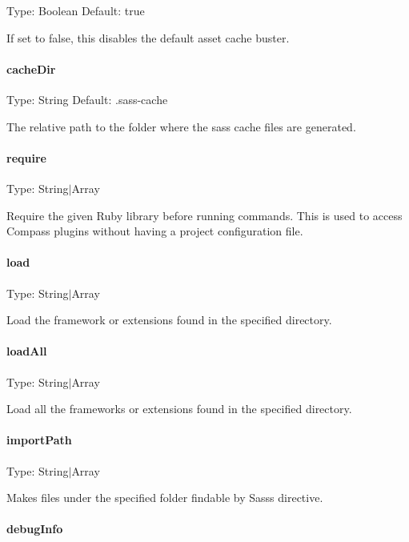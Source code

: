Type\+: {\ttfamily Boolean} Default\+: {\ttfamily true}

If set to {\ttfamily false}, this disables the default asset cache buster.

\paragraph*{cache\+Dir}

Type\+: {\ttfamily String} Default\+: {\ttfamily .sass-\/cache}

The relative path to the folder where the sass cache files are generated.

\paragraph*{require}

Type\+: {\ttfamily String$\vert$\+Array}

Require the given Ruby library before running commands. This is used to access Compass plugins without having a project configuration file.

\paragraph*{load}

Type\+: {\ttfamily String$\vert$\+Array}

Load the framework or extensions found in the specified directory.

\paragraph*{load\+All}

Type\+: {\ttfamily String$\vert$\+Array}

Load all the frameworks or extensions found in the specified directory.

\paragraph*{import\+Path}

Type\+: {\ttfamily String$\vert$\+Array}

Makes files under the specified folder findable by Sass\textquotesingle{}s  directive.

\paragraph*{debug\+Info}

